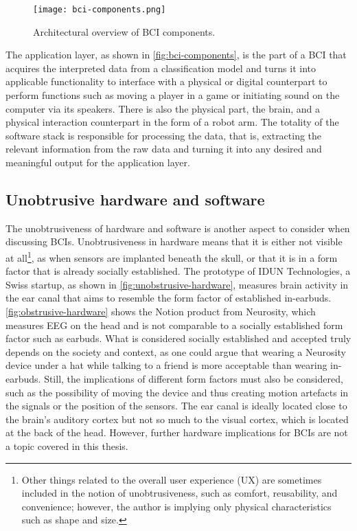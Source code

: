 \begin{figure}[!ht]
  \centering
  \texttt{[image: bci-components.png]}
  \caption{Architectural overview of BCI components.}
  \label{fig:bci-components}
\end{figure}

The application layer, as shown in \autoref{fig:bci-components}, is the part of a BCI that acquires the interpreted data from a classification model and turns it into applicable functionality to interface with a physical or digital counterpart to perform functions such as moving a player in a game or initiating sound on the computer via its speakers. There is also the physical part, the brain, and a physical interaction counterpart in the form of a robot arm. The totality of the software stack is responsible for processing the data, that is, extracting the relevant information from the raw data and turning it into any desired and meaningful output for the application layer.

\subsection{Unobtrusive hardware and software}
\label{chapter2-unobtrusive-hardware-and-software}

The unobtrusiveness of hardware and software is another aspect to consider when discussing BCIs. Unobtrusiveness in hardware means that it is either not visible at all\footnote{Other things related to the overall user experience (UX) are sometimes included in the notion of unobtrusiveness, such as comfort, reusability, and convenience; however, the author is implying only physical characteristics such as shape and size.}, as when sensors are implanted beneath the skull, or that it is in a form factor that is already socially established. The prototype of IDUN Technologies, a Swiss startup, as shown in \autoref{fig:unobstrusive-hardware}, measures brain activity in the ear canal that aims to resemble the form factor of established in-earbuds. \autoref{fig:obstrusive-hardware} shows the Notion product from Neurosity, which measures EEG on the head and is not comparable to a socially established form factor such as earbuds. What is considered socially established and accepted truly depends on the society and context, as one could argue that wearing a Neurosity device under a hat while talking to a friend is more acceptable than wearing in-earbuds. Still, the implications of different form factors must also be considered, such as the possibility of moving the device and thus creating motion artefacts in the signals or the position of the sensors. The ear canal is ideally located close to the brain’s auditory cortex but not so much to the visual cortex, which is located at the back of the head. However, further hardware implications for BCIs are not a topic covered in this thesis.

